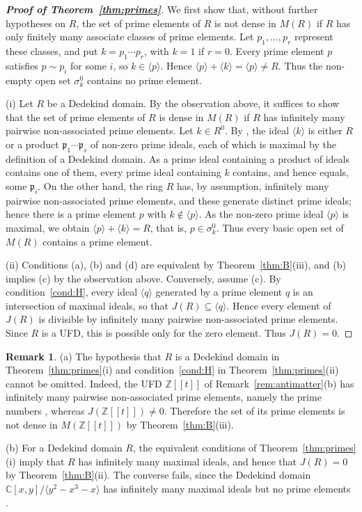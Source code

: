 \documentclass[12pt,reqno,a4paper]{amsart}
\newcommand{\Z}{\mathbb{Z}}
\newcommand{\C}{\mathbb{C}}
\newcommand{\pow}[1]{[\![#1]\!]}
\theoremstyle{plain}
\theoremstyle{definition}
\newtheorem{remark}[theorem]{Remark}
\begin{document}
\begin{proof}[\normalfont\bfseries Proof of Theorem~\ref{thm:primes}]
We first show that, without further hypotheses on $R$, the set of prime elements of $R$ is not dense in $M(R)$ if $R$ has only finitely many associate classes of prime elements. Let $p_1,\dots,p_r$ represent these classes, and put $k=p_1\cdots p_r$, with $k=1$ if $r=0$. Every prime element $p$ satisfies $p\sim p_i$ for some $i$, so $k\in\langle p\rangle$. Hence $\langle p\rangle+\langle k\rangle=\langle p\rangle\neq R$. Thus the non-empty open set $\sigma_k^0$ contains no prime element.

{(i)} Let $R$ be a Dedekind domain. By the observation above, it suffices to show that the set of prime elements of $R$ is dense in $M(R)$ if $R$ has infinitely many pairwise non-associated prime elements. Let $k\in R^0$. By \cite[Corollary~9.4]{AtiyahMacdonald}, the ideal $\langle k\rangle$ is either $R$ or a product $\mathfrak{p}_1\cdots\mathfrak{p}_s$ of non-zero prime ideals, each of which is maximal by the definition of a Dedekind domain. As a prime ideal containing a product of ideals contains one of them, every prime ideal containing $k$ contains, and hence equals, some $\mathfrak{p}_i$. On the other hand, the ring $R$ has, by assumption, infinitely many pairwise non-associated prime elements, and these generate distinct prime ideals; hence there is a prime element $p$ with $k\notin\langle p\rangle$. As the non-zero prime ideal $\langle p\rangle$ is maximal, we obtain $\langle p\rangle+\langle k\rangle=R$, that is, $p\in\sigma_k^0$. Thus every basic open set of $M(R)$ contains a prime element.

{(ii)} Conditions (a), (b) and (d) are equivalent by Theorem~\ref{thm:B}(iii), and (b) implies (c) by the observation above. Conversely, assume (c). By condition~\ref{cond:H}, every ideal $\langle q\rangle$ generated by a prime element $q$ is an intersection of maximal ideals, so that $J(R)\subseteq\langle q\rangle$. 
Hence every element of \(J(R)\) is divisible by infinitely many pairwise non-associated prime elements. Since \(R\) is a UFD, this is possible only for the zero element.
Thus $J(R)=0$.
\end{proof}
\begin{remark}\label{rem:ufd-sharp}
(a) The hypothesis that $R$ is a Dedekind domain in Theorem~\ref{thm:primes}(i) and condition~\ref{cond:H} in Theorem~\ref{thm:primes}(ii) cannot be omitted. Indeed, the UFD $\Z\pow{t}$ of Remark~\ref{rem:antimatter}(b) has infinitely many pairwise non-associated prime elements, namely the prime numbers \cite[Example~4.12]{Clark}, whereas $J(\Z\pow{t})\neq0$. Therefore the set of its prime elements is not dense in $M(\Z\pow{t})$ by Theorem~\ref{thm:B}(iii).

\noindent(b) For a Dedekind domain $R$, the equivalent conditions of Theorem~\ref{thm:primes}(i) imply that $R$ has infinitely many maximal ideals, and hence that $J(R)=0$ by Theorem~\ref{thm:B}(ii). The converse fails, since the Dedekind domain $\C[x,y]/\langle y^2-x^3-x\rangle$ has infinitely many maximal ideals but no prime elements \cite[proof of Theorem~5.5]{Clark}.
\end{remark}
\end{document}
